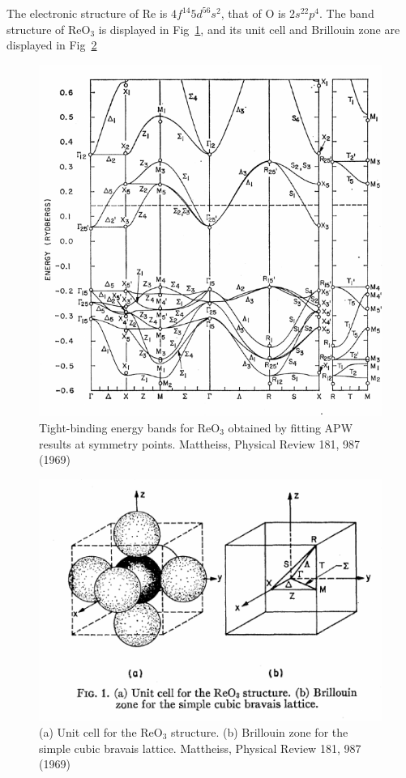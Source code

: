 The electronic structure of Re is $4f^{14}5d^56s^2$, that of O is
$2s^22p^4$. The band structure of ReO$_3$ is displayed in
Fig~\ref{fig:band_reo3}, and its unit cell and Brillouin zone are
displayed in Fig~\ref{fig:BZreo3}

\begin{figure}[h]
  \centering
  \includegraphics[width=16cm]{reo3_bands_v2.pdf}
  \caption{Tight-binding energy bands for ReO$_3$ obtained by fitting
    APW results at symmetry points.  Mattheiss, Physical Review
    181, 987 (1969)\label{fig:band_reo3}}
\end{figure}


\begin{figure}[h]
  \centering
  \includegraphics[width=12cm]{reo3bz.pdf}
  \caption{(a) Unit cell for the ReO$_3$ structure. (b) Brillouin zone
    for the simple cubic bravais lattice. Mattheiss, Physical Review
    181, 987 (1969)\label{fig:BZreo3}}
\end{figure}

